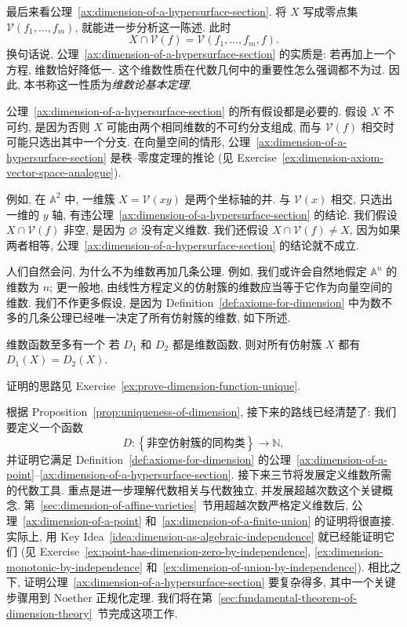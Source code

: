 最后来看公理~\ref{ax:dimension-of-a-hypersurface-section}. 将 $X$ 写成零点集 $\mathcal{V}(f_{1},\ldots,f_{m})$, 就能进一步分析这一陈述. 此时
\[
  X\cap\mathcal{V}(f)=\mathcal{V}(f_{1},\ldots,f_{m},f).
\]
换句话说, 公理~\ref{ax:dimension-of-a-hypersurface-section} 的实质是: 若再加上一个方程, 维数恰好降低一. 这个维数性质在代数几何中的重要性怎么强调都不为过. 因此, 本书称这一性质为\emph{维数论基本定理}.

\begin{BookFlowNote}[l]{%
公理~\ref{ax:dimension-of-a-hypersurface-section} 的所有假设都是必要的. 假设 $X$ 不可约, 是因为否则 $X$ 可能由两个相同维数的不可约分支组成, 而与 $\mathcal{V}(f)$ 相交时可能只选出其中一个分支.
}
\noindent 在向量空间的情形, 公理~\ref{ax:dimension-of-a-hypersurface-section} 是秩--零度定理的推论 (见 Exercise~\ref{ex:dimension-axiom-vector-space-analogue}).

例如, 在 $\mathbb{A}^{2}$ 中, 一维簇 $X=\mathcal{V}(xy)$ 是两个坐标轴的并. 与 $\mathcal{V}(x)$ 相交, 只选出一维的 $y$ 轴, 有违公理~\ref{ax:dimension-of-a-hypersurface-section} 的结论. 我们假设 $X\cap\mathcal{V}(f)$ 非空, 是因为 $\varnothing$ 没有定义维数. 我们还假设 $X\cap\mathcal{V}(f)\neq X$, 因为如果两者相等, 公理~\ref{ax:dimension-of-a-hypersurface-section} 的结论就不成立.
\end{BookFlowNote}

人们自然会问, 为什么不为维数再加几条公理. 例如, 我们或许会自然地假定 $\mathbb{A}^{n}$ 的维数为 $n$; 更一般地, 由线性方程定义的仿射簇的维数应当等于它作为向量空间的维数. 我们不作更多假设, 是因为 Definition~\ref{def:axioms-for-dimension} 中为数不多的几条公理已经唯一决定了所有仿射簇的维数, 如下所述.

\begin{Proposition}{维数函数至多有一个}\leavevmode\label{prop:uniqueness-of-dimension}
若 $D_{1}$ 和 $D_{2}$ 都是维数函数, 则对所有仿射簇 $X$ 都有 $D_{1}(X)=D_{2}(X)$.
\end{Proposition}
\begin{Proof}
证明的思路见 Exercise~\ref{ex:prove-dimension-function-unique}.
\end{Proof}

根据 Proposition~\ref{prop:uniqueness-of-dimension}, 接下来的路线已经清楚了: 我们要定义一个函数
\[
  D:\left\{\text{非空仿射簇的同构类}\right\}\longrightarrow\mathbb{N},
\]
并证明它满足 Definition~\ref{def:axioms-for-dimension} 的公理~\ref{ax:dimension-of-a-point}--\ref{ax:dimension-of-a-hypersurface-section}. 接下来三节将发展定义维数所需的代数工具. 重点是进一步理解代数相关与代数独立, 并发展超越次数这个关键概念. 第~\ref{sec:dimension-of-affine-varieties}~节用超越次数严格定义维数后, 公理~\ref{ax:dimension-of-a-point} 和~\ref{ax:dimension-of-a-finite-union} 的证明将很直接. 实际上, 用 Key Idea~\ref{idea:dimension-as-algebraic-independence} 就已经能证明它们 (见 Exercise~\ref{ex:point-has-dimension-zero-by-independence}, \ref{ex:dimension-monotonic-by-independence} 和~\ref{ex:dimension-of-union-by-independence}). 相比之下, 证明公理~\ref{ax:dimension-of-a-hypersurface-section} 要复杂得多, 其中一个关键步骤用到 Noether 正规化定理. 我们将在第~\ref{sec:fundamental-theorem-of-dimension-theory}~节完成这项工作.

